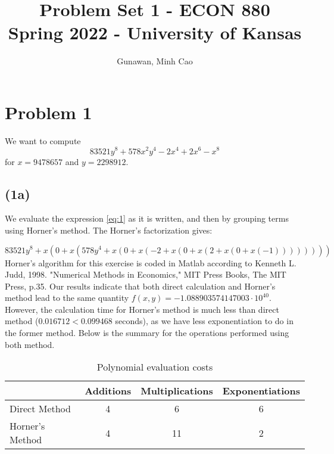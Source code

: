 \documentclass[11pt]{article}
\title{Problem Set 1 - ECON 880\\
	\small Spring 2022 - University of Kansas}
\author{Gunawan, Minh Cao}
\newcommand{\1}{\mathbbm{1}}
\begin{document}
\maketitle	
\section*{Problem 1}
We want to compute
\begin{equation}\label{eq:1}
	83521y^8 +578x^2 y^4 -2x^4 +2x^6 -x^8
\end{equation}
for $x = 9478657$ and $y = 2298912$.
\subsection*{(1a)}
We evaluate the expression \eqref{eq:1} as it is written, and then by grouping terms using Horner's method. The Horner's factorization gives:

\begin{equation*}
	83521y^8+x(0+x(578y^4+x(0+x(-2+x(0+x(2+x(0+x(-1))))))))
\end{equation*}
Horner's algorithm for this exercise is coded in Matlab according to Kenneth L. Judd, 1998. "Numerical Methods in Economics," MIT Press Books, The MIT Press, p.35. Our results indicate that both direct calculation and Horner's method lead to the same quantity $f(x,y) = -1.088903574147003\cdot 10^{40}$. However, the calculation time for Horner's method is much less than direct method ($0.016712 < 0.099468$ seconds), as we have less exponentiation to do in the former method. Below is the summary for the operations performed using both method.

	\begin{table}[h]
	\centering
	\begin{tabular}{l  c c c }
		\hline
		\hline
						& Additions & Multiplications & Exponentiations \\
		\hline
		Direct Method 	&4			&6&6\\
		Horner's Method &4			&11&2\\
		\hline
		\hline
	\end{tabular} 
	\caption{Polynomial evaluation costs}
	\label{tab:0}
\end{table}
\end{document}
